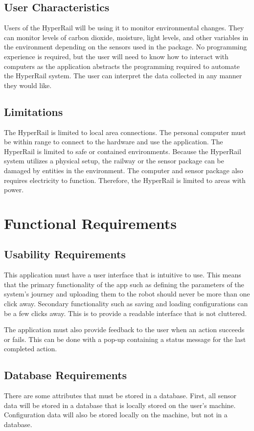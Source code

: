 \documentclass[onecolumn, draftclsnofoot,10pt, compsoc]{IEEEtran}
\begin{document}
\subsection{User Characteristics}
Users of the HyperRail will be using it to monitor environmental changes. They can monitor levels of carbon dioxide, moisture, light levels, and other variables in the environment depending on the sensors used in the package. No programming experience is required, but the user will need to know how to interact with computers as the application abstracts the programming required to automate the HyperRail system. The user can interpret the data collected in any manner they would like.


\subsection{Limitations}
The HyperRail is limited to local area connections. The personal computer must be within range to connect to the hardware and use the application. The HyperRail is limited to safe or contained environments. Because the HyperRail system utilizes a physical setup, the railway or the sensor package can be damaged by entities in the environment. The computer and sensor package also requires electricity to function. Therefore, the HyperRail is limited to areas with power.



\section{Functional Requirements}

\subsection{Usability Requirements}
This application must have a user interface that is intuitive to use. This means that the primary functionality of the app such as defining the parameters of the system's journey and uploading them to the robot should never be more than one click away. Secondary functionality such as saving and loading configurations can be a few clicks away. This is to provide a readable interface that is not cluttered. 

The application must also provide feedback to the user when an action succeeds or fails. This can be done with a pop-up containing a status message for the last completed action.

\subsection{Database Requirements}
There are some attributes that must be stored in a database. First, all sensor data will be stored in a database that is locally stored on the user's machine. Configuration data will also be stored locally on the machine, but not in a database.
\end{document}
